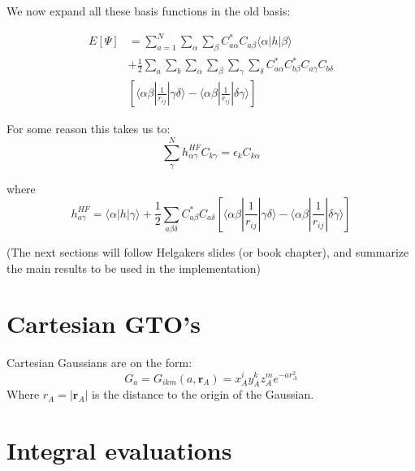 \documentclass[a4paper,10pt, twocolumn, pre]{revtex4}
\newcommand{\rvec}{\mathbf{r}}
\begin{document}
We now expand all these basis functions in the old basis:

\begin{align}
	E[\Psi] &= \sum_{a=1}^N \sum_\alpha \sum_\beta C_{a\alpha}^* C_{a\beta}\langle \alpha |h|\beta\rangle
	\nonumber \\
	&+
	\frac{1}{2} \sum_a \sum_b \sum_\alpha \sum_\beta \sum_\gamma \sum_\delta 
	C^*_{a\alpha} C^*_{b\beta} C_{a\gamma} C_{b\delta} \nonumber \\
	&\left[  \langle \alpha\beta |\frac{1}{r_{ij}}|\gamma\delta \rangle - \langle \alpha\beta | \frac{1}{r_{ij} }| \delta\gamma \rangle \right]
\end{align}

For some reason this takes us to:
\begin{equation}
	\sum_\gamma^N h_{\alpha\gamma}^{HF} C_{k\gamma} = \epsilon_k C_{k\alpha}
\end{equation}

where 
\begin{equation}
	h_{a\gamma}^{HF} = \langle \alpha |h|\gamma\rangle + \frac{1}{2}\sum_{a \beta \delta}  C^*_{a\beta}C_{a\delta} \left[ 
	\langle\alpha \beta|\frac{1}{r_{ij}}| \gamma \delta \rangle
	-
	\langle\alpha \beta|\frac{1}{r_{ij}}| \delta \gamma \rangle
	\right]
\end{equation}

(The next sections will follow Helgakers slides (or book chapter), and summarize the main results to be used in the implementation)
\section{Cartesian GTO's}
Cartesian Gaussians are on the form:
\begin{equation}
	G_a = G_{ikm}(a, \rvec_A) = x^i_A y^k_A z^m_A e^{-ar^2_A}
\end{equation}
Where $r_A = |\rvec_A|$ is the distance to the origin of the Gaussian.

\section{Integral evaluations}
\end{document}
